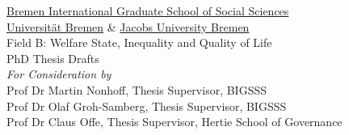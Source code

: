 
\begin{titlepage}

\centering

\thispagestyle{empty}

\vspace*{\fill}

	{\Large \href{http://www.bigsss-bremen.de}{Bremen International Graduate School of Social Sciences}}
	\\
	{\Large \href{http://www.uni-bremen.de}{Universität Bremen} \& \href{http://www.jacobs-university.de}{Jacobs University Bremen}}
	\\
	\vspace{15pt}
	{\Large Field B: Welfare State, Inequality and Quality of Life}
	\\
	\vspace{50pt}
	{\Large PhD Thesis Drafts}
	\\
	\vspace{30pt}
	{\Large \emph{For Consideration by}}
	\\
	\vspace{30pt}
	{\large Prof Dr Martin Nonhoff, Thesis Supervisor, BIGSSS}
	\\
	\vspace{10pt}
	{\large Prof Dr Olaf Groh-Samberg, Thesis Supervisor, BIGSSS}
	\\
	\vspace{10pt}
	{\large Prof Dr Claus Offe, Thesis Supervisor, Hertie School of Governance}
	\\
	\vspace{30pt}

\vspace*{\fill}

\end{titlepage}
